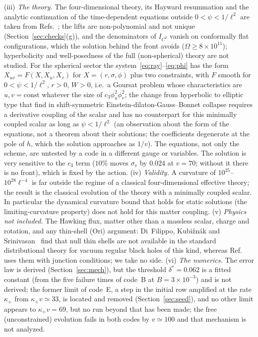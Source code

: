 \documentclass[11pt]{article}
\begin{document}
(iii) \emph{The theory.} The four-dimensional theory, its Hayward resummation and the analytic continuation of the time-dependent equations outside $0<\psi<1/\ell^{2}$ are taken from Refs.~\cite{BuenoCanoHennigarMurcia2025,BorissovaCarballoRubio2026}; the lifts are non-polynomial and not unique (Section~\ref{sec:checks}(g)), and the denominators of $I_{C^{2}}$ vanish on conformally flat configurations, which the solution behind the front avoids ($\Omega\ge8\times10^{11}$); hyperbolicity and well-posedness of the full (non-spherical) theory are not studied. For the spherical sector the system~\eqref{eq:ray}--\eqref{eq:phi} has the form $X_{uv}=F(X,X_u,X_v)$ for $X=(r,\sigma,\phi)$ plus two constraints, with $F$ smooth for $0<\psi<1/\ell^{2}$, $r>0$, $W>0$, i.e.\ a Goursat problem whose characteristics are $u,v=\mathrm{const}$ whatever the size of $c_3\phi_u^{2}\phi_v^{2}$; the change from hyperbolic to elliptic type that \citet{RipleyPretorius2019} find in shift-symmetric Einstein-dilaton-Gauss--Bonnet collapse requires a derivative coupling of the scalar and has no counterpart for this minimally coupled scalar as long as $\psi<1/\ell^{2}$ (an observation about the form of the equations, not a theorem about their solutions; the coefficients degenerate at the pole of $h$, which the solution approaches as $1/v$). The equations, not only the scheme, are untested by a code in a different gauge or variables. The solution is very sensitive to the $c_3$ term ($10\%$ moves $\sigma_v$ by $0.024$ at $v=70$; without it there is no front), which is fixed by the action.
(iv) \emph{Validity.} A curvature of $10^{25}$--$10^{28}\ell^{-4}$ is far outside the regime of a classical four-dimensional effective theory; the result is the classical evolution of the theory with a minimally coupled scalar. In particular the dynamical curvature bound that holds for static solutions (the limiting-curvature property) does not hold for this matter coupling.
(v) \emph{Physics not included.} The Hawking flux, matter other than a massless scalar, charge and rotation, and any thin-shell (Ori) argument: Di~Filippo, Kubi\v{z}n\'ak and Srinivasan~\cite{DiFilippo2026} find that null thin shells are not available in the standard distributional theory for vacuum regular black holes of this kind, whereas Ref.~\cite{FrolovZelnikov2026} uses them with junction conditions; we take no side.
(vi) \emph{The numerics.} The error law is derived (Section~\ref{sec:mech}), but the threshold $\delta^{*}=0.062$ is a fitted constant (from the five failure times of code~B at $B=3\times10^{-3}$) and is not derived; the former limit of code~E, a step in the initial row amplified at the rate $\kappa_+$ from $\kappa_+v\simeq33$, is located and removed (Section~\ref{sec:seed}), and no other limit appears to $\kappa_+v=69$, but no run beyond that has been made; the free (unconstrained) evolution fails in both codes by $v\simeq100$ and that mechanism is not analyzed.
\end{document}
